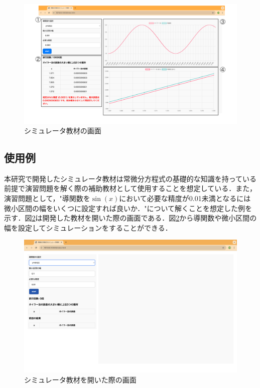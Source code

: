 \documentclass[a4paper, 12pt]{ltjsarticle}
\begin{document}
\begin{figure}[h]
\begin{center}
\includegraphics[clip,width=\textwidth,keepaspectratio]{sim-image.pdf}
\end{center}
\caption{シミュレータ教材の画面}
\label{fig:シミュレータ教材の画面}
\end{figure}

\clearpage
\subsection{使用例}
本研究で開発したシミュレータ教材は常微分方程式の基礎的な知識を持っている前提で演習問題を解く際の補助教材として使用することを想定している．また，演習問題として，"導関数を$\sin(x)$において必要な精度が0.01未満となるには微小区間の幅をいくつに設定すれば良いか．"について解くことを想定した例を示す．図\ref{fig:シミュレータ教材を開いた際の画面}は開発した教材を開いた際の画面である．図\ref{fig:シミュレータ教材を開いた際の画面}から導関数や微小区間の幅を設定してシミュレーションをすることができる．

\begin{figure}[h]
\begin{center}
\includegraphics[clip,width=\textwidth,keepaspectratio]{sim-sample1.png}
\end{center}
\caption{シミュレータ教材を開いた際の画面}
\label{fig:シミュレータ教材を開いた際の画面}
\end{figure}
\end{document}
